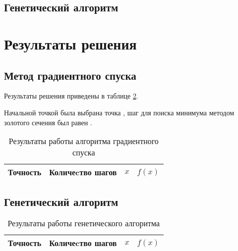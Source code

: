 \documentclass[10pt,a4paper,titlepage]{article}
\begin{document}
\subsection{Генетический алгоритм}

\section{Результаты решения}
\subsection{Метод градиентного спуска}
Результаты решения приведены в таблице \ref{gd-result-table}.

Начальной точкой была выбрана точка , 
шаг для поиска минимума методом золотого сечения был равен .

\begin{table}[H]
\caption{Результаты работы алгоритма градиентного спуска}
\label{gd-result-table}
\begin{center}
\begin{tabular}{|c|c|c|c|}
\hline
Точность & Количеcтво шагов & $x$ & $f(x)$ \\
\hline

\hline
\end{tabular}
\end{center}
\end{table}

\subsection{Генетический алгоритм}

\begin{table}[H]
\caption{Результаты работы генетического алгоритма}
\label{gd-result-table}
\begin{center}
\begin{tabular}{|c|c|c|c|}
\hline
Точность & Количеcтво шагов & $x$ & $f(x)$ \\
\hline

\hline
\end{tabular}
\end{center}
\end{table}

\end{document}
